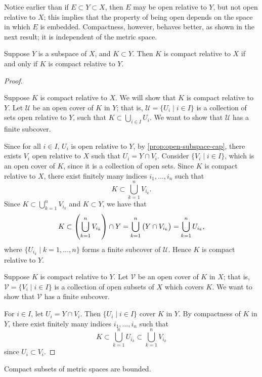 Notice earlier than if $E\subset Y\subset X$, then $E$ may be open relative to $Y$, but not open relative to $X$; this implies that the property of being open depends on the space in which $E$ is embedded. Compactness, however, behaves better, as shown in the next result; it is independent of the metric space.

\begin{proposition}
Suppose $Y$ is a subspace of $X$, and $K\subset Y$. Then $K$ is compact relative to $X$ if and only if $K$ is compact relative to $Y$.
\end{proposition}

\begin{proof} \

\fbox{$\implies$} Suppose $K$ is compact relative to $X$. We will show that $K$ is compact relative to $Y$. Let $\mathcal{U}$ be an open cover of $K$ in $Y$; that is, $\mathcal{U}=\{U_i\mid i\in I\}$ is a collection of sets open relative to $Y$, such that $K\subset\bigcup_{i\in I}U_i$. We want to show that $\mathcal{U}$ has a finite subcover.

Since for all $i\in I$, $U_i$ is open relative to $Y$, by \cref{prop:open-subspace-cap}, there exists $V_i$ open relative to $X$ such that $U_i=Y\cap V_i$. Consider $\{V_i\mid i\in I\}$, which is an open cover of $K$, since it is a collection of open sets. Since $K$ is compact relative to $X$, there exist finitely many indices $i_1,\dots,i_n$ such that
\[K\subset\bigcup_{k=1}^{n}V_{i_k}.\]
Since $K\subset\bigcup_{k=1}^{n}V_{i_k}$ and $K\subset Y$, we have that
\[K\subset\left(\bigcup_{k=1}^{n}V_{i_k}\right)\cap Y=\bigcup_{k=1}^{n}\left(Y\cap V_{i_k}\right)=\bigcup_{k=1}^{n}U_{i_k},\]
where $\{U_{i_k}\mid k=1,\dots,n\}$ forms a finite subcover of $\mathcal{U}$. Hence $K$ is compact relative to $Y$.

\fbox{$\impliedby$} Suppose $K$ is compact relative to $Y$. Let $\mathcal{V}$ be an open cover of $K$ in $X$; that is, $\mathcal{V}=\{V_i\mid i\in I\}$ is a collection of open subsets of $X$ which covers $K$. We want to show that $\mathcal{V}$ has a finite subcover.

For $i\in I$, let $U_i=Y\cap V_i$. Then $\{U_i\mid i\in I\}$ cover $K$ in $Y$. By compactness of $K$ in $Y$, there exist finitely many indices $i_1,\dots,i_n$ such that
\[K\subset\bigcup_{k=1}^{n}U_{i_k}\subset\bigcup_{k=1}^{n}V_{i_k}\]
since $U_i\subset V_i$.
\end{proof}

\begin{proposition}\label{prop:compact-bounded}
Compact subsets of metric spaces are bounded.
\end{proposition}

